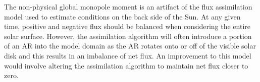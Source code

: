 \documentclass[namedreferences]{solarphysics}
\begin{document}
\begin{article}

The non-physical global monopole moment is an artifact of the flux assimilation model used to estimate conditions on the back side of the Sun. At any given time, positive and negative flux should be balanced when considering the entire solar surface. However, the assimilation algorithm will often introduce a portion of an AR into the model domain as the AR rotates onto or off of the visible solar disk and this results in an imbalance of net flux. An improvement to this model would involve altering the assimilation algorithm to maintain net flux closer to zero.


\end{article}
\end{document}
